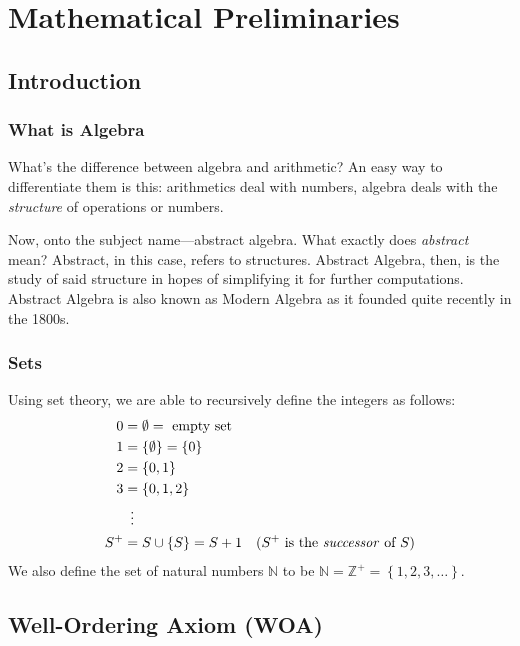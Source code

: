 \chapter{Mathematical Preliminaries}

\section{Introduction}

\subsection{What is Algebra}

What's the difference between algebra and arithmetic? An easy way to differentiate them is this: arithmetics deal with numbers, algebra deals with the \textit{structure} of operations or numbers.

Now, onto the subject name---abstract algebra. What exactly does \textit{abstract} mean? Abstract, in this case, refers to structures. Abstract Algebra, then, is the study of said structure in hopes of simplifying it for further computations. Abstract Algebra is also known as Modern Algebra as it founded quite recently in the 1800s.

\subsection{Sets}

Using set theory, we are able to recursively define the integers as follows:
\[
\begin{aligned}
    0 &= \emptyset = \text{ empty set} \\
    1 &= \left\{\emptyset\right\} = \left\{0\right\} \\
    2 &= \left\{0, 1\right\} \\
    3 &= \left\{0, 1, 2\right\} \\
      &\phantom{0}\vdots \\
    S^+ &= S \cup \left\{S\right\} = S+1 &\text{(\(S^+\) is the \textit{successor} of \(S\))}
\end{aligned}
\]
We also define the set of natural numbers \(\mathbb{N}\) to be \( \mathbb{N} = \mathbb{Z}^+ = \left\{1, 2, 3, \ldots\right\}\).

\section{Well-Ordering Axiom (WOA)}

